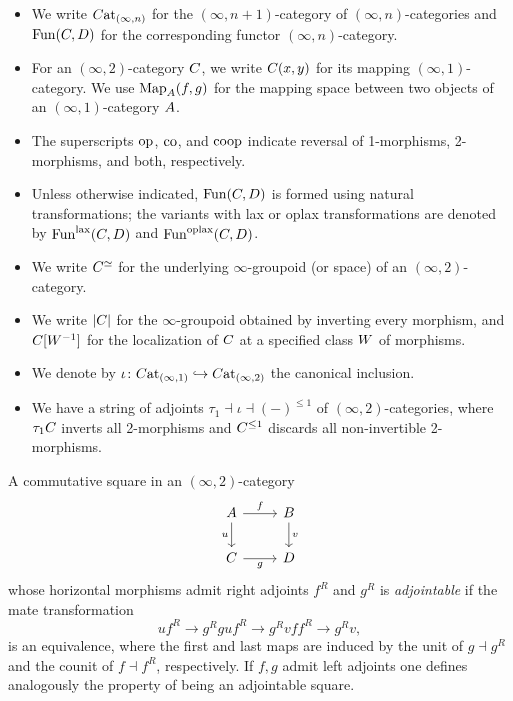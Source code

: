 \documentclass[a4paper,reqno,twoside]{amsart}
\begin{document}
\begin{notation}\label{not:adjointstring}
	\leavevmode\par
	\begin{itemize}
		\item We write $\relax{C}\mathrm{at}_{(\infty,n)}$ for the $(\infty,n+1)$-category of $(\infty,n)$-categories and $\mathrm{Fun}(\relax{C},\relax{D})$ for the corresponding functor $(\infty,n)$-category.
		\item For an $(\infty,2)$-category $\relax{C}$, we write $\relax{C}(x,y)$ for its mapping $(\infty,1)$-category. We use $\operatorname{Map}_{\relax{A}}(f,g)$ for the mapping space between two objects of an $(\infty,1)$-category $\relax{A}$.
		\item The superscripts $\mathrm{op}$, $\mathrm{co}$, and $\mathrm{coop}$ indicate reversal of 1-morphisms, 2-morphisms, and both, respectively.

		\item Unless otherwise indicated, $\mathrm{Fun}(\relax{C},\relax{D})$ is formed using natural transformations; the variants with lax or oplax transformations are denoted by $\mathrm{Fun}^{\mathrm{lax}}(\relax{C},\relax{D})$ and $\mathrm{Fun}^{\mathrm{oplax}}(\relax{C},\relax{D})$.
		\item We write $\relax{C}^{\simeq}$ for the underlying $\infty$-groupoid (or space) of an $(\infty,2)$-category.  
		\item We write $|\relax{C}|$ for the $\infty$-groupoid obtained by inverting every morphism, and $\relax{C}[\relax{W}^{-1}]$ for the localization of $\relax{C}$ at a specified class $\relax{W}$ of morphisms.
		\item We denote by $\iota \colon \relax{C}\mathrm{at}_{(\infty,1)} \hookrightarrow \relax{C}\mathrm{at}_{(\infty,2)}$ the canonical inclusion.
		\item We have a string of adjoints $\tau_1 \dashv \iota \dashv (-)^{\leq 1}$ of $(\infty,2)$-categories, where $\tau_1 \relax{C}$ inverts all 2-morphisms and $\relax{C}^{\leq 1}$ discards all non-invertible 2-morphisms. 
	\end{itemize}
\end{notation}

\begin{definition}\label{def:adjointable}
	A commutative square in an $(\infty,2)$-category
	\[
	\begin{tikzcd}
		\cA \arrow[r,"f"] \arrow[d,"u"'] & \cB \arrow[d,"v"] \\
		\cC \arrow[r,"g"'] & \cD
	\end{tikzcd}
	\]
	whose horizontal morphisms admit right adjoints $f^R$ and $g^R$ is
	\emph{adjointable} if the mate transformation
	\[
		u f^R \xrightarrow{} g^R g u f^R
		\xrightarrow{} g^R v f f^R \xrightarrow{} g^R v,
	\]
	is an equivalence, where the first and last maps are induced by the unit of $g \dashv g^R$
	and the counit of $f \dashv f^R$, respectively. If $f,g$ admit left adjoints one defines analogously the property of being an adjointable square.
\end{definition}
\end{document}
